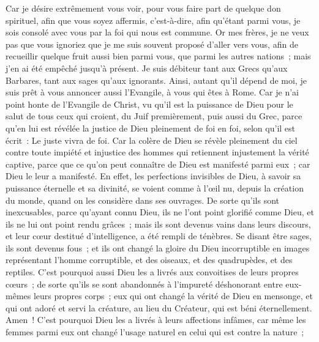 \begin{multicols}{2}
Car je désire extrêmement vous voir, pour vous faire part de quelque don spirituel, afin que vous soyez affermis,
c'est-à-dire, afin qu'étant parmi vous, je sois consolé avec vous par la foi qui nous est commune.
Or mes frères, je ne veux pas que vous ignoriez que je me suis souvent proposé d'aller vers vous, afin de recueillir quelque fruit aussi bien parmi vous, que parmi les autres nations~; mais j'en ai été empêché jusqu'à présent.
Je suis débiteur tant aux Grecs qu'aux Barbares, tant aux sages qu'aux ignorants.
Ainsi, autant qu'il dépend de moi, je suis prêt à vous annoncer aussi l'Evangile, à vous qui êtes à Rome.
Car je n'ai point honte de l'Evangile de Christ, vu qu'il est la puissance de Dieu pour le salut de tous ceux qui croient, du Juif premièrement, puis aussi du Grec,
parce qu'en lui est révélée la justice de Dieu pleinement de foi en foi, selon qu'il est écrit~: Le juste vivra de foi.
Car la colère de Dieu se révèle pleinement du ciel contre toute impiété et injustice des hommes qui retiennent injustement la vérité captive,
parce que ce qu'on peut connaître de Dieu est manifesté parmi eux~; car Dieu le leur a manifesté.
En effet, les perfections invisibles de Dieu, à savoir sa puissance éternelle et sa divinité, se voient comme à l'œil nu, depuis la création du monde, quand on les considère dans ses ouvrages. De sorte qu'ils sont inexcusables,
parce qu'ayant connu Dieu, ils ne l'ont point glorifié comme Dieu, et ils ne lui ont point rendu grâces~; mais ils sont devenus vains dans leurs discours, et leur cœur destitué d'intelligence, a été rempli de ténèbres.
Se disant être sages, ils sont devenus fous~;
et ils ont changé la gloire du Dieu incorruptible en images représentant l'homme corruptible, et des oiseaux, et des quadrupèdes, et des reptiles.
C'est pourquoi aussi Dieu les a livrés aux convoitises de leurs propres cœurs~; de sorte qu'ils se sont abandonnés à l'impureté déshonorant entre eux-mêmes leurs propres corps~;
eux qui ont changé la vérité de Dieu en mensonge, et qui ont adoré et servi la créature, au lieu du Créateur, qui est béni éternellement. Amen~!
C'est pourquoi Dieu les a livrés à leurs affections infâmes, car même les femmes parmi eux ont changé l'usage naturel en celui qui est contre la nature~;

\end{multicols}
